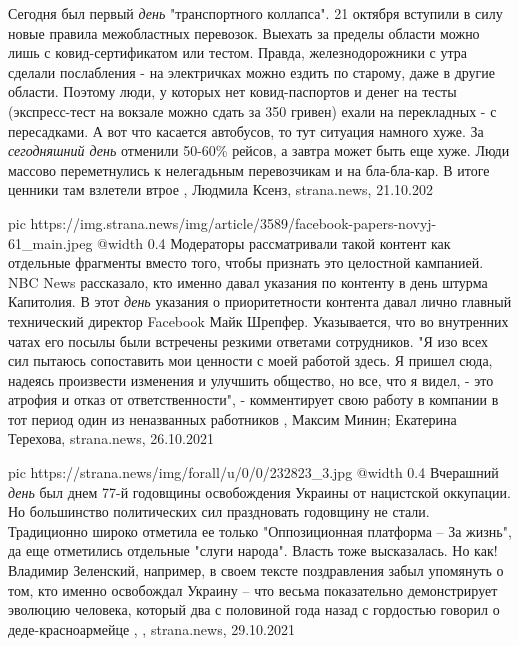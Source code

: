 Сегодня был первый \emph{день} "транспортного коллапса". 21 октября вступили в силу
новые правила межобластных перевозок. Выехать за пределы области можно лишь с
ковид-сертификатом или тестом. Правда, железнодорожники с утра сделали
послабления - на электричках можно ездить по старому, даже в другие области.
Поэтому люди, у которых нет ковид-паспортов и денег на тесты (экспресс-тест на
вокзале можно сдать за 350 гривен) ехали на перекладных - с пересадками.  А вот
что касается автобусов, то тут ситуация намного хуже. За \emph{сегодняшний день}
отменили 50-60\% рейсов, а завтра может быть еще хуже. Люди массово
переметнулись к нелегадьным перевозчикам и на бла-бла-кар. В итоге ценники там
взлетели втрое
, Людмила Ксенз, strana.news, 21.10.202

\ifcmt
  pic https://img.strana.news/img/article/3589/facebook-papers-novyj-61_main.jpeg
  @width 0.4
\fi
Модераторы рассматривали такой контент как отдельные фрагменты вместо того,
чтобы признать это целостной кампанией.  NBC News рассказало, кто именно давал
указания по контенту в день штурма Капитолия.  В этот \emph{день} указания о
приоритетности контента давал лично главный технический директор Facebook Майк
Шрепфер. Указывается, что во внутренних чатах его посылы были встречены резкими
ответами сотрудников.  "Я изо всех сил пытаюсь сопоставить мои ценности с моей
работой здесь. Я пришел сюда, надеясь произвести изменения и улучшить общество,
но все, что я видел, - это атрофия и отказ от ответственности", - комментирует
свою работу в компании в тот период один из неназванных работников
, 
Максим Минин; Екатерина Терехова, strana.news, 26.10.2021

\ifcmt
  pic https://strana.news/img/forall/u/0/0/232823_3.jpg
  @width 0.4
\fi
Вчерашний \emph{день} был днем 77-й годовщины освобождения Украины от нацистской
оккупации. Но большинство политических сил праздновать годовщину не стали.
Традиционно широко отметила ее только "Оппозиционная платформа – За жизнь", да
еще отметились отдельные "слуги народа".  Власть тоже высказалась. Но как!
Владимир Зеленский, например, в своем тексте поздравления забыл упомянуть о
том, кто именно освобождал Украину – что весьма показательно демонстрирует
эволюцию человека, который два с половиной года назад с гордостью говорил о
деде-красноармейце
, 
, strana.news, 29.10.2021

